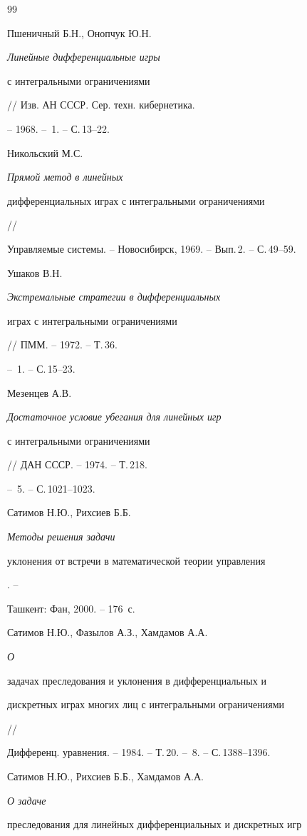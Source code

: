 \begin{thebibliography}{99}







Пшеничный Б.Н., Онопчук Ю.Н. {\em Линейные дифференциальные игры


с интегральными ограничениями} // Изв. АН СССР. Сер. техн. кибернетика.


-- 1968. -- \No\,1. -- С.\,13--22.




Никольский М.С. {\em Прямой метод в линейных


дифференциальных играх с интегральными ограничениями} // 


Управляемые системы. -- Новосибирск, 1969. -- Вып.\,2. -- С.\,49--59.




Ушаков В.Н. {\em Экстремальные стратегии в дифференциальных


играх с интегральными ограничениями} // ПММ. -- 1972. -- Т.\,36.


-- \No\,1. -- С.\,15--23.




Мезенцев А.В. {\em Достаточное условие убегания для линейных игр


с интегральными ограничениями} // ДАН СССР. -- 1974. -- Т.\,218.


-- \No\,5. -- С.\,1021--1023.




Сатимов Н.Ю., Рихсиев Б.Б. {\em Методы решения задачи


уклонения от встречи в математической теории управления}. -- 


Ташкент: Фан, 2000. -- 176~с.




Сатимов Н.Ю., Фазылов А.З., Хамдамов А.А. {\em О


задачах преследования и уклонения в дифференциальных и


дискретных играх многих лиц с интегральными ограничениями} //


Дифференц. уравнения. -- 1984. -- Т.\,20. -- \No\,8. -- С.\,1388--1396.




Сатимов Н.Ю., Рихсиев Б.Б., Хамдамов А.А. {\em О задаче


преследования для линейных дифференциальных и дискретных игр


}
\end{thebibliography}
